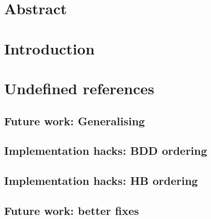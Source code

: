 \documentclass[12pt,a4paper]{report}
\begin{document}


\maketitle
\tableofcontents

\chapter{Abstract}


\chapter{Introduction}














\chapter{Undefined references}
\section{Future work: Generalising}
\label{sect:future_work:generalising}

\section{Implementation hacks: BDD ordering}
\label{sect:implementation_hacks:bdd_ordering}

\section{Implementation hacks: HB ordering}
\label{sect:implementation_hacks:hb_ordering}

\section{Future work: better fixes}
\label{sect:future_work:better_fixes}

\printglossaries



\end{document}
